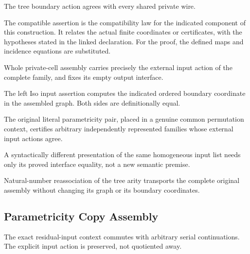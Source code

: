The tree boundary action agrees with every shared private wire.
\par{}

The compatible assertion is the compatibility law for the indicated component of this construction. It relates the actual finite coordinates or certificates, with the hypotheses stated in the linked declaration.
For the proof, the defined maps and incidence equations are substituted.
\par{}

Whole private-cell assembly carries precisely the external input action of the complete family, and fixes its empty output interface.
\par{}

The left Iso input assertion computes the indicated ordered boundary coordinate in the assembled graph.
Both sides are definitionally equal.
\par{}

The original literal parametricity pair, placed in a genuine common permutation context, certifies arbitrary independently represented families whose external input actions agree.
\par{}

A syntactically different presentation of the same homogeneous input list needs only its proved interface equality, not a new semantic premise.
\par{}

Natural-number reassociation of the tree arity transports the complete original assembly without changing its graph or its boundary coordinates.
\par{}

\subsection{Parametricity Copy Assembly}
The exact residual-input context commutes with arbitrary serial continuations. The explicit input action is preserved, not quotiented away.

